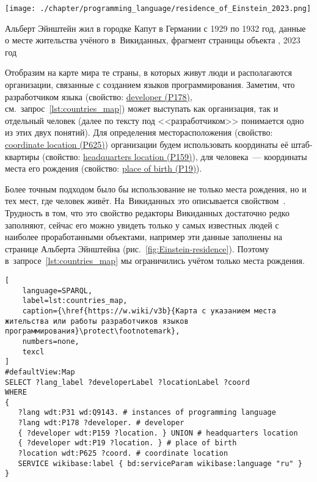 \begin{marginfigure}%
\centering
	\texttt{[image: ./chapter/programming\_language/residence\_of\_Einstein\_2023.png]}
	\caption[Место жительства Альберта Эйнштейна.]{
Альберт Эйнштейн жил в городке Капут в Германии с 1929 по 1932 год, данные о месте жительства учёного в~Викиданных, фрагмент страницы объекта , 2023 год}
	\label{fig:Einstein-residence}
\end{marginfigure}
%
Отобразим на карте мира те страны, в которых живут люди и располагаются организации, 
связанные с созданием языков программирования. 
Заметим, что разработчиком языка 
(свойство: \href{https://www.wikidata.org/wiki/Property:P178}{developer (P178)}, 
см.~запрос~\ref{lst:countries_map}) может выступать как организация, 
так и отдельный человек 
(далее по тексту под <<разработчиком>> понимается одно из этих двух понятий). 
Для определения месторасположения 
(свойство: \href{https://www.wikidata.org/wiki/Property:P625}{coordinate location (P625)}) 
организации будем использовать координаты её штаб-квартиры 
(свойство: \href{https://www.wikidata.org/wiki/Property:P159}{headquarters location (P159)}), 
для человека~--- координаты места его рождения 
(свойство: \href{https://www.wikidata.org/wiki/Property:P19}{place of birth (P19)}). 

Более точным подходом было бы использование не только места рождения, но и тех мест, где человек живёт. 
На~Викиданных это описывается свойством~. 
Трудность в том, что это свойство редакторы Викиданных достаточно редко заполняют, 
сейчас его можно увидеть только у самых известных людей с наиболее проработанными объектами, 
например эти данные заполнены на странице Альберта Эйнштейна (рис.~\ref{fig:Einstein-residence}). 
Поэтому в~запросе~\ref{lst:countries_map} мы ограничились учётом только места рождения. 

\begin{lstlisting}[
	language=SPARQL,
	label=lst:countries_map,
	caption={\href{https://w.wiki/v3b}{Карта с указанием места жительства или работы разработчиков языков программирования}\protect\footnotemark},
    numbers=none,
	texcl
]
#defaultView:Map
SELECT ?lang_label ?developerLabel ?locationLabel ?coord
WHERE
{
   ?lang wdt:P31 wd:Q9143. # instances of programming language
   ?lang wdt:P178 ?developer. # developer
   { ?developer wdt:P159 ?location. } UNION # headquarters location
   { ?developer wdt:P19 ?location. } # place of birth
   ?location wdt:P625 ?coord. # coordinate location
   SERVICE wikibase:label { bd:serviceParam wikibase:language "ru" } 	
}
\end{lstlisting}


